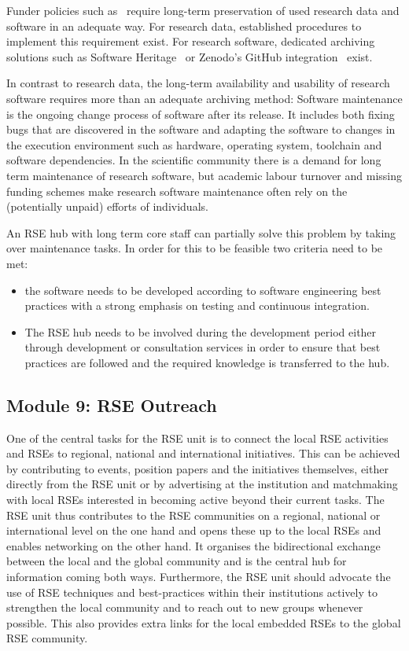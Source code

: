 \documentclass[a4paper]{article}
\begin{document}
Funder policies such as~\autocite{dfg_gsp} require long-term preservation of used research data and software in an adequate way.
For research data, established procedures to implement this requirement exist.
For research software, dedicated archiving solutions such as Software Heritage~\autocite{DiCosmo2020,DiCosmo2023} or Zenodo's GitHub integration~\autocite{GitHubZenodo} exist.

In contrast to research data, the long-term availability and usability of research software requires more than an adequate archiving method:
Software maintenance is the ongoing change process of software after its release.
It includes  both fixing bugs that are discovered in the software and adapting the software to changes in the execution environment such as hardware, operating system, toolchain and software dependencies.
In the scientific community there is a demand for long term maintenance of research software,
but academic labour turnover and missing funding schemes make research software maintenance often rely on the (potentially unpaid) efforts of individuals.

An RSE hub with long term core staff can partially solve this problem by taking over maintenance tasks.
In order for this to be feasible two criteria need to be met:
\begin{itemize}
\item the software needs to be developed according to software engineering best practices with a strong emphasis on testing and continuous integration.
\item The RSE hub needs to be involved during the development period either through development or consultation services in order to ensure that best practices are followed and the required knowledge is transferred to the hub.
\end{itemize}

\subsection{Module 9: RSE Outreach}%
\label{sec:outreach}

One of the central tasks for the RSE unit is to connect the local RSE activities and RSEs to regional, national and international initiatives.
This can be achieved by contributing to events, position papers and the initiatives themselves,
either directly from the RSE unit or by advertising at the institution and matchmaking with local RSEs interested in becoming active beyond their current tasks.
The RSE unit thus contributes to the RSE communities on a regional, national or international level on the one hand and opens these up to the local RSEs and enables networking on the other hand.
It organises the bidirectional exchange between the local and the global community and is the central hub for information coming both ways.
Furthermore, the RSE unit should advocate the use of RSE techniques and best-practices within their institutions actively to strengthen the local community and to reach out to new groups whenever possible. 
This also provides extra links for the local embedded RSEs to the global RSE community.
\end{document}

